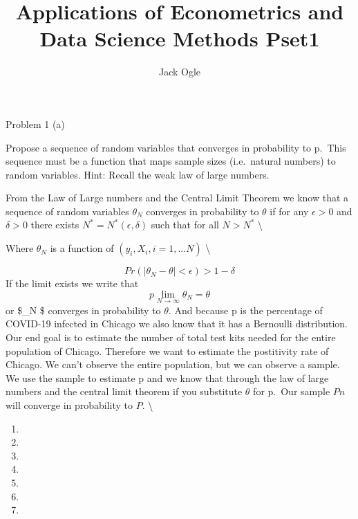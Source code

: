\documentclass[
  12pt,
  landscape]{article}
\title{Applications of Econometrics and Data Science Methods Pset1}
\author{Jack Ogle}
\date{}
\begin{document}
\maketitle

Problem 1 (a)

Propose a sequence of random variables that converges in probability to
p.~This sequence must be a function that maps sample sizes (i.e.~natural
numbers) to random variables. Hint: Recall the weak law of large
numbers.

From the Law of Large numbers and the Central Limit Theorem we know that
a sequence of random variables \({\theta_N }\) converges in probability
to \({\theta}\) if for any \({\epsilon} > 0\) and \({\delta} > 0\) there
exists \({N^*} = N^*(\epsilon, \delta)\) such that for all \({N > N^*}\)
\textbackslash{}

Where \(\theta_N\) is a function of \((y_i, X_i, i = 1,...N)\)
\textbackslash{}

\[
Pr(|\theta_N-\theta|<\epsilon) >1-\delta
\] If the limit exists we write that
\[p\lim_{N\to \infty}\theta_N = \theta\] or \$\theta\_N \$ converges in
probability to \(\theta\). And because p is the percentage of COVID-19
infected in Chicago we also know that it has a Bernoulli distribution.
Our end goal is to estimate the number of total test kits needed for the
entire population of Chicago. Therefore we want to estimate the
postitivity rate of Chicago. We can't observe the entire population, but
we can observe a sample. We use the sample to estimate p and we know
that through the law of large numbers and the central limit theorem if
you substitute \(\theta\) for p.~Our sample \(Pn\) will converge in
probability to \(P\). \textbackslash{}

\begin{enumerate}
\def\labelenumi{(\alph{enumi})}
\setcounter{enumi}{1}
\item
\item
\item
\item
\item
\item
\item
\end{enumerate}
\end{document}
